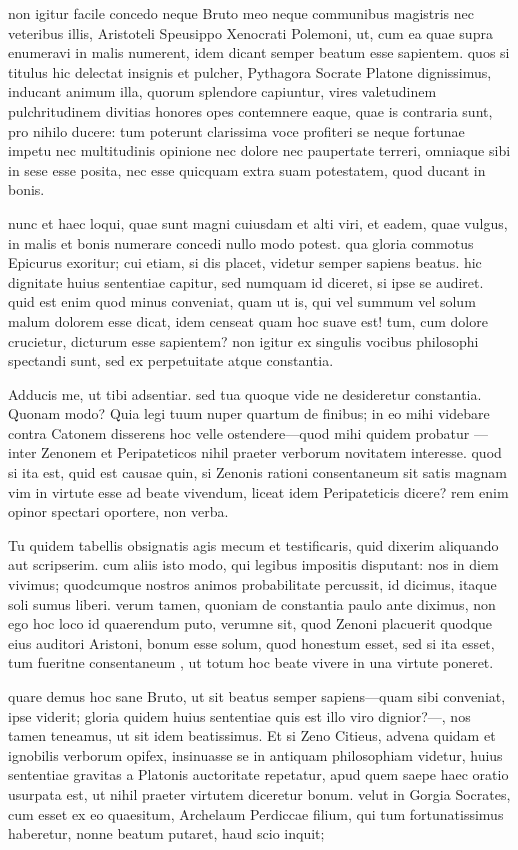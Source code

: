  non igitur facile concedo neque Bruto meo neque communibus magistris nec veteribus illis, Aristoteli Speusippo Xenocrati Polemoni, ut, cum ea quae supra enumeravi in malis numerent, idem dicant semper beatum esse sapientem. quos si titulus hic delectat insignis et pulcher, Pythagora Socrate Platone dignissimus, inducant animum illa, quorum splendore capiuntur, vires valetudinem pulchritudinem divitias honores opes contemnere eaque, quae is contraria sunt, pro nihilo ducere: tum poterunt clarissima voce profiteri se neque fortunae impetu nec multitudinis opinione nec dolore nec paupertate terreri, omniaque sibi in sese esse posita, nec esse quicquam extra suam potestatem, quod ducant in bonis.

 nunc et haec loqui, quae sunt magni cuiusdam et alti viri, et eadem, quae vulgus, in malis et bonis numerare concedi nullo modo potest. qua gloria commotus Epicurus exoritur; cui etiam, si dis placet, videtur semper sapiens beatus. hic dignitate huius sententiae capitur, sed numquam id diceret, si ipse se audiret. quid est enim quod minus conveniat, quam ut is, qui vel summum vel solum malum dolorem esse dicat, idem censeat quam hoc suave est! tum, cum dolore crucietur, dicturum esse sapientem? non igitur ex singulis vocibus philosophi spectandi sunt, sed ex perpetuitate atque constantia.

 Adducis me, ut tibi adsentiar. sed tua quoque vide ne desideretur constantia. Quonam modo? Quia legi tuum nuper quartum de finibus; in eo mihi videbare contra Catonem disserens hoc velle ostendere—quod mihi quidem probatur —inter Zenonem et Peripateticos nihil praeter verborum novitatem interesse. quod si ita est, quid est causae quin, si Zenonis rationi consentaneum sit satis magnam vim in virtute esse ad beate vivendum, liceat idem Peripateticis dicere? rem enim opinor spectari oportere, non verba.

 Tu quidem tabellis obsignatis agis mecum et testificaris, quid dixerim aliquando aut scripserim. cum aliis isto modo, qui legibus impositis disputant: nos in diem vivimus; quodcumque nostros animos probabilitate percussit, id dicimus, itaque soli sumus liberi. verum tamen, quoniam de constantia paulo ante diximus, non ego hoc loco id quaerendum puto, verumne sit, quod Zenoni placuerit quodque eius auditori Aristoni, bonum esse solum, quod honestum esset, sed si ita esset, tum fueritne consentaneum , ut totum hoc beate vivere in una virtute poneret.

 quare demus hoc sane Bruto, ut sit beatus semper sapiens—quam sibi conveniat, ipse viderit; gloria quidem huius sententiae quis est illo viro dignior?—, nos tamen teneamus, ut sit idem beatissimus. Et si Zeno Citieus, advena quidam et ignobilis verborum opifex, insinuasse se in antiquam philosophiam videtur, huius sententiae gravitas a Platonis auctoritate repetatur, apud quem saepe haec oratio usurpata est, ut nihil praeter virtutem diceretur bonum. velut in Gorgia Socrates, cum esset ex eo quaesitum, Archelaum Perdiccae filium, qui tum fortunatissimus haberetur, nonne beatum putaret, haud scio inquit;

